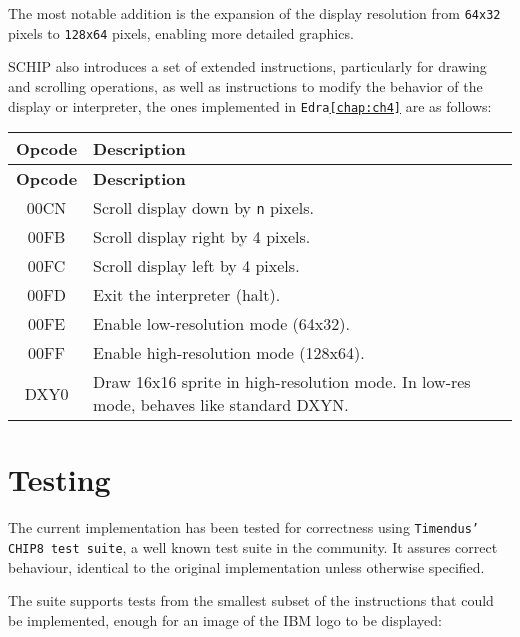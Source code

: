 \par The most notable addition is the expansion of the display resolution from \texttt{64x32} pixels to \texttt{128x64} pixels, enabling more detailed graphics.

\par SCHIP also introduces a set of extended instructions\cite{CHIP8Gulrak}, particularly for drawing and scrolling operations, as well as instructions to modify the behavior of the display or interpreter, the ones implemented in \texttt{Edra\ref{chap:ch4}} are as follows:

\begin{longtable}{|c|p{10cm}|}
\hline
\textbf{Opcode} & \textbf{Description} \\
\hline
\endfirsthead

\hline
\textbf{Opcode} & \textbf{Description} \\
\hline
\endhead

\hline
\endfoot

\hline
\endlastfoot

00CN & Scroll display down by \texttt{n} pixels. \\
00FB & Scroll display right by 4 pixels. \\
00FC & Scroll display left by 4 pixels. \\
00FD & Exit the interpreter (halt). \\
00FE & Enable low-resolution mode (64x32). \\
00FF & Enable high-resolution mode (128x64). \\
DXY0 & Draw 16x16 sprite in high-resolution mode. In low-res mode, behaves like standard DXYN. \\
\end{longtable}

\section{Testing}
\label{sec:ch3sec5}

\par The current implementation has been tested for correctness using \texttt{Timendus' CHIP8 test suite\cite{CHIP8Timendus}}, a well known test suite in the community. It assures correct behaviour, identical to the original implementation unless otherwise specified. 

\par The suite supports tests from the smallest subset of the instructions that could be implemented, enough for an image of the IBM logo to be displayed:

